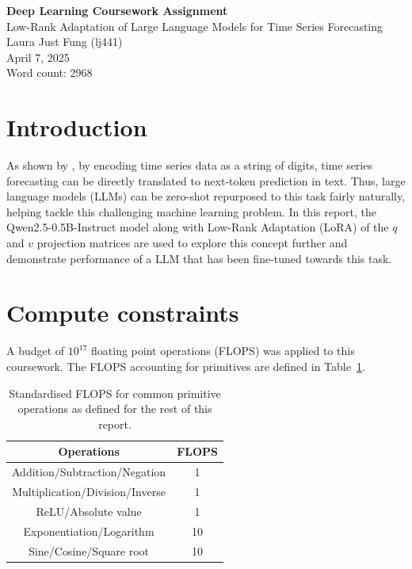 \documentclass[11pt,a4paper]{article}
\renewcommand{\arraystretch}{0.8}
\begin{document}
 

\begin{center}
    \LARGE{\textbf{Deep Learning Coursework Assignment}}
    \\
    \Large{{Low-Rank Adaptation of Large Language Models for Time Series Forecasting}}
    \\
    \large{Laura Just Fung (lj441)}
    \\
    April 7, 2025
    \\
    Word count: 2968
\end{center}

\section{Introduction}
As shown by \citeauthor{gruver2024largelanguagemodelszeroshot}, by encoding time series data as a string of digits, time series forecasting can be directly translated to next-token prediction in text. Thus, large language models (LLMs) can be zero-shot repurposed to this task fairly naturally, helping tackle this challenging machine learning problem. In this report, the Qwen2.5-0.5B-Instruct model \citep{yang2024qwen2technicalreport} along with Low-Rank Adaptation (LoRA) of the $q$ and $v$ projection matrices are used to explore this concept further and demonstrate performance of a LLM that has been fine-tuned towards this task.

\section{Compute constraints}
\label{sec:constraints}
A budget of $10^{17}$ floating point operations (FLOPS) was applied to this coursework. The FLOPS accounting for primitives are defined in Table~\ref{tab:flops_primitives}.
\renewcommand{\arraystretch}{1.2}
\begin{table}[h]
    \centering
    \begin{tabular}{c|c}
        Operations & FLOPS \\
        \hline
        Addition/Subtraction/Negation & 1 \\
        Multiplication/Division/Inverse & 1 \\
        ReLU/Absolute value & 1 \\
        Exponentiation/Logarithm & 10\\
        Sine/Cosine/Square root & 10 \\
        
    \end{tabular}
    \caption{Standardised FLOPS for common primitive operations as defined for the rest of this report.}
    \label{tab:flops_primitives}
\end{table}
\end{document}

